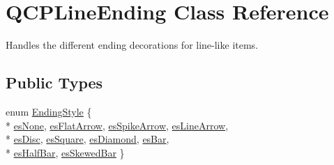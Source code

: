 \hypertarget{classQCPLineEnding}{}\section{Q\+C\+P\+Line\+Ending Class Reference}
\label{classQCPLineEnding}


Handles the different ending decorations for line-\/like items.  


\subsection*{Public Types}
\begin{DoxyCompactItemize}
\item 
enum \hyperlink{classQCPLineEnding_a5ef16e6876b4b74959c7261d8d4c2cd5}{Ending\+Style} \{ \\*
\hyperlink{classQCPLineEnding_a5ef16e6876b4b74959c7261d8d4c2cd5aca12d500f50cd6871766801bac30fb03}{es\+None}, 
\hyperlink{classQCPLineEnding_a5ef16e6876b4b74959c7261d8d4c2cd5a3d7dcea2f100671727c3417142154f8f}{es\+Flat\+Arrow}, 
\hyperlink{classQCPLineEnding_a5ef16e6876b4b74959c7261d8d4c2cd5ab9964d0d03f812d1e79de15edbeb2cbf}{es\+Spike\+Arrow}, 
\hyperlink{classQCPLineEnding_a5ef16e6876b4b74959c7261d8d4c2cd5a61f78ee8f375fb21cb9d250687bbcbd2}{es\+Line\+Arrow}, 
\\*
\hyperlink{classQCPLineEnding_a5ef16e6876b4b74959c7261d8d4c2cd5ae5a3414916817258bcc6dddd605e8f5c}{es\+Disc}, 
\hyperlink{classQCPLineEnding_a5ef16e6876b4b74959c7261d8d4c2cd5ae1836502fa43d8990bb62b2d493a140a}{es\+Square}, 
\hyperlink{classQCPLineEnding_a5ef16e6876b4b74959c7261d8d4c2cd5a378fe5a8b768411b0bc1765210fe7200}{es\+Diamond}, 
\hyperlink{classQCPLineEnding_a5ef16e6876b4b74959c7261d8d4c2cd5a2cf543bbca332df26d89bf779f50469f}{es\+Bar}, 
\\*
\hyperlink{classQCPLineEnding_a5ef16e6876b4b74959c7261d8d4c2cd5a126c390f0c359fcd8df1fc5e38d26d5b}{es\+Half\+Bar}, 
\hyperlink{classQCPLineEnding_a5ef16e6876b4b74959c7261d8d4c2cd5a2b2cc96e757ca9bcd91fb70221ed43ab}{es\+Skewed\+Bar}
 \}
\end{DoxyCompactItemize}
